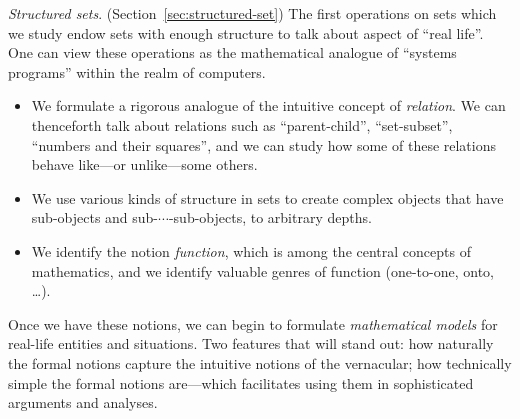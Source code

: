 {\it Structured sets}.  (Section~\ref{sec:structured-set}) The first operations on sets which we study endow sets with enough structure to talk about aspect of  ``real life''.  One can view these operations as the mathematical analogue of ``systems programs'' within the realm of computers.
\begin{itemize}
\item
We formulate a rigorous analogue of the intuitive concept of {\it relation}.  We can thenceforth talk about relations such as ``parent-child'', ``set-subset'', ``numbers and their squares'', and we can study how some of these relations behave like---or unlike---some others.
\medskip\item
We use various kinds of structure in sets to create complex objects that have sub-objects and sub-$\cdots$-sub-objects, to arbitrary depths.
\medskip\item
We identify the notion {\it function}, which is among the central concepts of mathematics, and we identify valuable genres of function (one-to-one, onto, \ldots).
\end{itemize}
Once we have these notions, we can begin to formulate {\it mathematical models} for real-life entities and situations.  Two features that will stand out: how naturally the formal notions capture the intuitive notions of the vernacular; how technically simple the formal notions are---which facilitates using them in sophisticated arguments and analyses.

\bigskip


